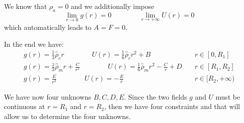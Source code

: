 We know that $\rho_a=0$ and we additionally impose
\[
\lim_{r\rightarrow 0} g(r) = 0 
\qquad
\qquad
\lim_{r\rightarrow +\infty} U(r) = 0 
\]
which automatically leads to $A=F=0$.

In the end we have:
\begin{eqnarray}
g(r)= \frac{1}{3}\hat{\rho}_c r  \qquad\qquad
U(r)= \frac{1}{6}\hat{\rho}_c r^2   + B & \quad r\in[0,R_1]\\ 
g(r)= \frac{1}{3}\hat{\rho}_m r +\frac{C}{r^2} \qquad\qquad
U(r)= \frac{1}{6}\hat{\rho}_m r^2  -\frac{C}{r} + D & \quad  r\in[R_1,R_2]\\ 
g(r)= \frac{E}{r^2} \qquad\qquad
U(r)= -\frac{E}{r}  & \quad r\in[R_2,+\infty) 
\end{eqnarray}

We have now four unknowns $B,C,D,E$. Since the two fields $g$ and $U$
must be continuous at $r=R_1$ and $r=R_2$, then we have four constraints and 
that will allow us to determine the four unknowns.

